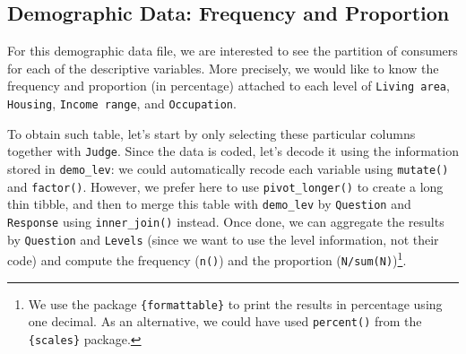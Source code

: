 \documentclass[
]{book}
\begin{document}
\hypertarget{demographic-data-frequency-and-proportion}{%
\subsection{Demographic Data: Frequency and Proportion}\label{demographic-data-frequency-and-proportion}}

For this demographic data file, we are interested to see the partition of consumers for each of the descriptive variables. More precisely, we would like to know the frequency and proportion (in percentage) attached to each level of \texttt{Living\ area}, \texttt{Housing}, \texttt{Income\ range}, and \texttt{Occupation}.

To obtain such table, let's start by only selecting these particular columns together with \texttt{Judge}.
Since the data is coded, let's decode it using the information stored in \texttt{demo\_lev}: we could automatically recode each variable using \texttt{mutate()} and \texttt{factor()}. However, we prefer here to use \texttt{pivot\_longer()} to create a long thin tibble, and then to merge this table with \texttt{demo\_lev} by \texttt{Question} and \texttt{Response} using \texttt{inner\_join()} instead. Once done, we can aggregate the results by \texttt{Question} and \texttt{Levels} (since we want to use the level information, not their code) and compute the frequency (\texttt{n()}) and the proportion (\texttt{N/sum(N)})\footnote{We use the package \texttt{\{formattable\}} to print the results in percentage using one decimal. As an alternative, we could have used \texttt{percent()} from the \texttt{\{scales\}} package.}.
\end{document}
